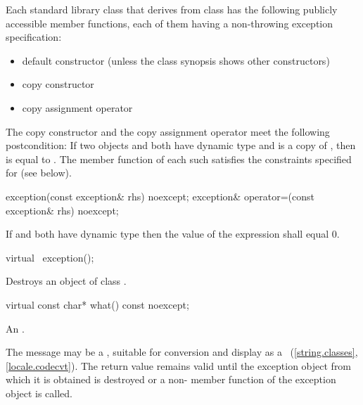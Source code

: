 \pnum
Each standard library class  that derives from class 
has the following publicly accessible member functions, each of them having
a non-throwing exception specification:
\begin{itemize}
\item default constructor (unless the class synopsis shows other constructors)
\item copy constructor
\item copy assignment operator
\end{itemize}
The copy constructor and the copy assignment operator meet
the following postcondition: If two objects  and  both have
dynamic type  and  is a copy of , then
 is equal to .
The  member function of each such  satisfies the
constraints specified for  (see below).

%
%
\begin{itemdecl}
exception(const exception& rhs) noexcept;
exception& operator=(const exception& rhs) noexcept;
\end{itemdecl}

\begin{itemdescr}
\pnum
\ensures
If  and  both have dynamic type 
then the value of the expression  shall equal 0.
\end{itemdescr}

%
\begin{itemdecl}
virtual ~exception();
\end{itemdecl}

\begin{itemdescr}
\pnum
\effects
Destroys an object of class
.
\end{itemdescr}

%
\begin{itemdecl}
virtual const char* what() const noexcept;
\end{itemdecl}

\begin{itemdescr}
\pnum
\returns
An  \ntbs{}.

\pnum
\remarks
The message may be a
,
suitable for conversion and display as a
~(\ref{string.classes}, \ref{locale.codecvt}).
The return value remains valid until the exception object from which
it is obtained is destroyed or a non-
member function of the exception object is called.
\end{itemdescr}

